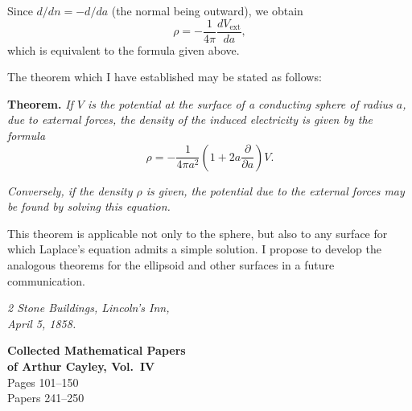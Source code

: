 \documentclass[11pt,a4paper]{book}
\begin{document}
Since $d/dn = -d/da$ (the normal being outward), we obtain
\[
\rho = -\frac{1}{4\pi} \frac{dV_{\text{ext}}}{da},
\]
which is equivalent to the formula given above.

\setcounter{page}{100}

The theorem which I have established may be stated as follows:

\medskip
\noindent\textbf{Theorem.} \textit{If $V$ is the potential at the surface of a conducting sphere of radius $a$, due to external forces, the density of the induced electricity is given by the formula}
\[
\rho = -\frac{1}{4\pi a^2} \left(1 + 2a\frac{\partial}{\partial a}\right) V.
\]

\textit{Conversely, if the density $\rho$ is given, the potential due to the external forces may be found by solving this equation.}

\medskip
This theorem is applicable not only to the sphere, but also to any surface for which Laplace's equation admits a simple solution. I propose to develop the analogous theorems for the ellipsoid and other surfaces in a future communication.

\medskip
\noindent\textit{2 Stone Buildings, Lincoln's Inn,\\April 5, 1858.}
\clearpage


\begin{center}
\Huge\textbf{Collected Mathematical Papers}\\[6pt]
\LARGE\textbf{of Arthur Cayley, Vol.\ IV}\\[12pt]
\Large Pages 101--150\\[6pt]
\large Papers 241--250
\end{center}

\vspace{2em}


\newpage

\newpage
\end{document}
